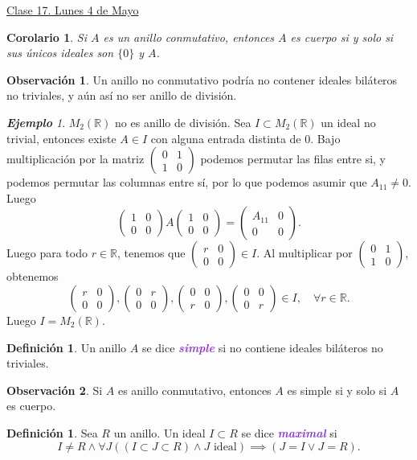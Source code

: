 \documentclass{article}
\newtheorem{corollary}[theorem]{Corolario}
\theoremstyle{definition}
\newtheorem{definition}[theorem]{Definición}
\newtheorem*{obs}{Observación}
\theoremstyle{remark}
\newtheorem{example}[theorem]{\textbf{Ejemplo}}
\numberwithin{equation}{section}
\newcommand{\R}{\mathbb{R}}
\newcommand{\matr}[1]{\begin{pmatrix}#1\end{pmatrix}}
\newcommand{\wea}[1]{\textcolor{BlueViolet}{\textbf{\emph{#1}}}}
\newcommand{\fecha}[1]{\begin{flushright} \underline{#1} \end{flushright}}
\begin{document}
\fecha{Clase 17. Lunes 4 de Mayo}

\begin{corollary}
  Si $A$ es un anillo conmutativo, entonces $A$ es cuerpo si y solo si sus únicos ideales son $\{0\}$ y $A$.
\end{corollary}

\begin{obs}
  Un anillo no conmutativo podría no contener ideales biláteros no triviales, y aún así no ser anillo de división.
\end{obs}

\begin{example}
  $M_2(\R)$ no es anillo de división. Sea $I \subset M_2(\R)$ un ideal no trivial, entonces existe $A \in I$ con alguna entrada distinta de 0. Bajo multiplicación por la matriz $\matr{0&1\\1&0}$ podemos permutar las filas entre si, y podemos permutar las columnas entre sí, por lo que podemos asumir que $A_{11} \neq 0$. Luego 
  \[ \matr{1&0\\0&0} A \matr{1&0\\0&0} = \matr{A_{11} & 0 \\ 0 & 0}. \]
  Luego para todo $r \in \R$, tenemos que $\matr{r & 0 \\ 0 & 0} \in I$. Al multiplicar por $\matr{0&1\\1&0}$, obtenemos 
  \[ \matr{r&0\\0&0}, \matr{0&r\\0&0}, \matr{0&0\\r&0}, \matr{0&0\\0&r} \in I, \quad \forall r \in \R. \]
  Luego $I = M_2(\R)$.
\end{example}

\begin{definition}
  Un anillo $A$ se dice \wea{simple} si no contiene ideales biláteros no triviales.
\end{definition}

\begin{obs}
  Si $A$ es anillo conmutativo, entonces $A$ es simple si y solo si $A$ es cuerpo.
\end{obs}

\begin{definition}
  Sea $R$ un anillo. Un ideal $I \subset R$ se dice \wea{maximal} si 
  \[ I \neq R \land \forall J ((I \subset J \subset R) \land J \text{ ideal}) \implies (J = I \lor J = R). \]
\end{definition}
\end{document}
